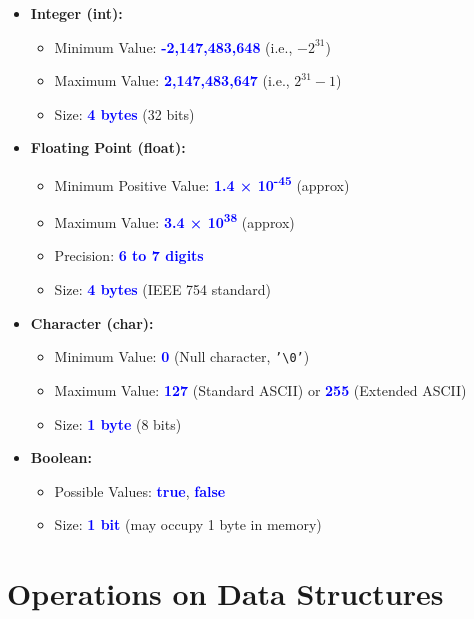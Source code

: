 \begin{itemize}
  \item \textbf{Integer (int):}
    \begin{itemize}
      \item Minimum Value: \textbf{\textcolor{blue}{-2,147,483,648}} (i.e., $-2^{31}$)
      \item Maximum Value: \textbf{\textcolor{blue}{2,147,483,647}} (i.e., $2^{31} - 1$)
      \item Size: \textbf{\textcolor{blue}{4 bytes}} (32 bits)
    \end{itemize}

  \item \textbf{Floating Point (float):}
    \begin{itemize}
      \item Minimum Positive Value: \textbf{\textcolor{blue}{1.4 × 10\textsuperscript{-45}}} (approx)
      \item Maximum Value: \textbf{\textcolor{blue}{3.4 × 10\textsuperscript{38}}} (approx)
      \item Precision: \textbf{\textcolor{blue}{6 to 7 digits}}
      \item Size: \textbf{\textcolor{blue}{4 bytes}} (IEEE 754 standard)
    \end{itemize}

  \item \textbf{Character (char):}
    \begin{itemize}
      \item Minimum Value: \textbf{\textcolor{blue}{0}} (Null character, \texttt{'\textbackslash 0'})
      \item Maximum Value: \textbf{\textcolor{blue}{127}} (Standard ASCII) or \textbf{\textcolor{blue}{255}} (Extended ASCII)
      \item Size: \textbf{\textcolor{blue}{1 byte}} (8 bits)
    \end{itemize}

  \item \textbf{Boolean:}
    \begin{itemize}
      \item Possible Values: \textbf{\textcolor{blue}{true}}, \textbf{\textcolor{blue}{false}}
      \item Size: \textbf{\textcolor{blue}{1 bit}} (may occupy 1 byte in memory)
    \end{itemize}
\end{itemize}

\section*{\Large \textbf{Operations on Data Structures}}

